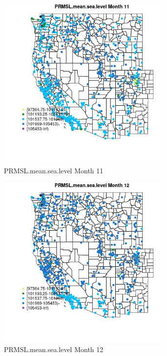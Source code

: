 \begin{figure} 
\centering  
\includegraphics[width=0.77\textwidth]{Code_Outputs/Report_ML_input_PM25_Step4_part_f_de_duplicated_aves_prioritize_24hr_obswNAs_MapObsMo11PRMSLmeansealevel.jpg} 
\caption{\label{fig:Report_ML_input_PM25_Step4_part_f_de_duplicated_aves_prioritize_24hr_obswNAsMapObsMo11PRMSLmeansealevel}PRMSL.mean.sea.level Month 11} 
\end{figure} 
 

\clearpage 

\begin{figure} 
\centering  
\includegraphics[width=0.77\textwidth]{Code_Outputs/Report_ML_input_PM25_Step4_part_f_de_duplicated_aves_prioritize_24hr_obswNAs_MapObsMo12PRMSLmeansealevel.jpg} 
\caption{\label{fig:Report_ML_input_PM25_Step4_part_f_de_duplicated_aves_prioritize_24hr_obswNAsMapObsMo12PRMSLmeansealevel}PRMSL.mean.sea.level Month 12} 
\end{figure} 
 

